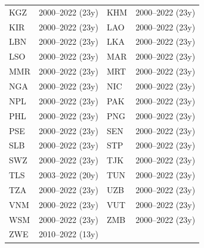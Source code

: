 \documentclass[10pt,a4paper]{article}
\begin{document}
\begin{center}
\begin{longtable}{llll}
KGZ & 2000--2022 (23y) & KHM & 2000--2022 (23y) \\
KIR & 2000--2022 (23y) & LAO & 2000--2022 (23y) \\
LBN & 2000--2022 (23y) & LKA & 2000--2022 (23y) \\
LSO & 2000--2022 (23y) & MAR & 2000--2022 (23y) \\
MMR & 2000--2022 (23y) & MRT & 2000--2022 (23y) \\
NGA & 2000--2022 (23y) & NIC & 2000--2022 (23y) \\
NPL & 2000--2022 (23y) & PAK & 2000--2022 (23y) \\
PHL & 2000--2022 (23y) & PNG & 2000--2022 (23y) \\
PSE & 2000--2022 (23y) & SEN & 2000--2022 (23y) \\
SLB & 2000--2022 (23y) & STP & 2000--2022 (23y) \\
SWZ & 2000--2022 (23y) & TJK & 2000--2022 (23y) \\
TLS & 2003--2022 (20y) & TUN & 2000--2022 (23y) \\
TZA & 2000--2022 (23y) & UZB & 2000--2022 (23y) \\
VNM & 2000--2022 (23y) & VUT & 2000--2022 (23y) \\
WSM & 2000--2022 (23y) & ZMB & 2000--2022 (23y) \\
ZWE & 2010--2022 (13y) & & \\
\bottomrule
\end{longtable}
\end{center}
\end{document}

